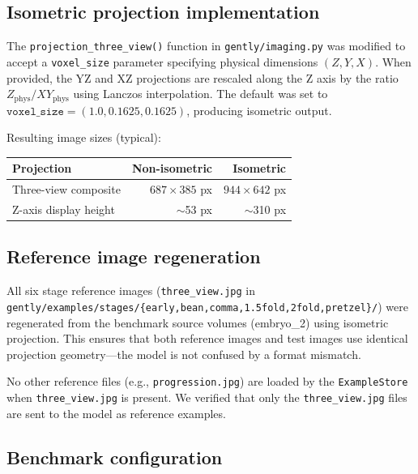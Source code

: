\documentclass[11pt, a4paper]{article}
\begin{document}
\subsection{Isometric projection implementation}

The \texttt{projection\_three\_view()} function in \texttt{gently/imaging.py}
was modified to accept a \texttt{voxel\_size} parameter specifying physical
dimensions $(Z, Y, X)$.  When provided, the YZ and XZ projections are rescaled
along the Z axis by the ratio $Z_{\text{phys}} / XY_{\text{phys}}$ using
Lanczos interpolation.  The default was set to
$\texttt{voxel\_size} = (1.0, 0.1625, 0.1625)$, producing isometric output.

Resulting image sizes (typical):
\begin{center}
\begin{tabular}{@{}lrr@{}}
\toprule
\textbf{Projection} & \textbf{Non-isometric} & \textbf{Isometric} \\
\midrule
Three-view composite & $687 \times 385$ px & $944 \times 642$ px \\
Z-axis display height & $\sim$53 px & $\sim$310 px \\
\bottomrule
\end{tabular}
\end{center}

\subsection{Reference image regeneration}

All six stage reference images (\texttt{three\_view.jpg} in
\texttt{gently/examples/stages/\{early,bean,comma,1.5fold,2fold,pretzel\}/})
were regenerated from the benchmark source volumes (embryo\_2) using isometric
projection.  This ensures that both reference images and test images use
identical projection geometry---the model is not confused by a format mismatch.

No other reference files (e.g., \texttt{progression.jpg}) are loaded by the
\texttt{ExampleStore} when \texttt{three\_view.jpg} is present.  We verified
that only the \texttt{three\_view.jpg} files are sent to the model as reference
examples.

\subsection{Benchmark configuration}
\end{document}
